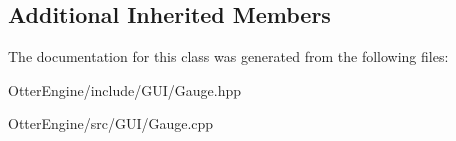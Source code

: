 \subsection*{Additional Inherited Members}


The documentation for this class was generated from the following files\+:\begin{DoxyCompactItemize}
\item 
Otter\+Engine/include/\+G\+U\+I/Gauge.\+hpp\item 
Otter\+Engine/src/\+G\+U\+I/Gauge.\+cpp\end{DoxyCompactItemize}
